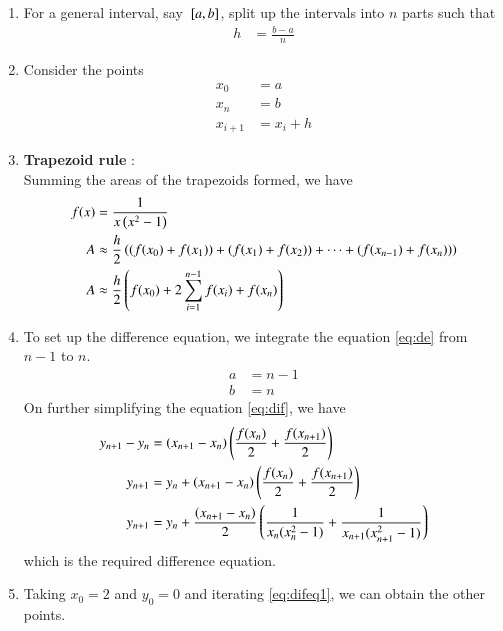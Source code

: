 \documentclass[journal]{IEEEtran}
\begin{document}
\begin{enumerate}
\item For a general interval, say ${}\left[a,b\right]$, split up the intervals into $n$ parts such that
\begin{align}
	h &= \frac{b-a}{n} \label{eq:split}
\end{align}
\item Consider the points 
\begin{align}
	x_{0} &= a \\
	x_{n} &= b \\
	x_{i+1} &= x_{i} + h
\end{align}
\item \textbf{Trapezoid rule} : \\
Summing the areas of the trapezoids formed, we have
\begin{align}
	f(x) &= \frac{1}{x \left(x^2 - 1\right)} \\
	A &\approx \frac{h}{2} \left((f(x_{0}) + f(x_{1})) + (f(x_{1}) + f(x_{2})) + \dots + (f(x_{n-1}) + f(x_{n}))\right) \\
	A &\approx \frac{h}{2} \left(f(x_{0}) + 2 \sum_{i=1}^{n-1} f(x_{i}) + f(x_{n}) \right) \label{eq:dif}
\end{align}
\item To set up the difference equation, we integrate the equation \eqref{eq:de} from $n-1$ to $n$.
	\begin{align}
		a &= n-1 \\
		b &= n
	\end{align}
		On further simplifying the equation \eqref{eq:dif}, we have
		\begin{align}
			y_{n+1} - y_{n} &= \left(x_{n+1} - x_{n}\right) \left(\frac{f(x_{n})}{2} + \frac{f(x_{n+1})}{2}\right) \\
			y_{n+1} &= y_{n} + \left(x_{n+1} - x_{n}\right) \left(\frac{f(x_{n})}{2} + \frac{f(x_{n+1})}{2}\right) \\
			y_{n+1} &= y_{n} + \frac{\left(x_{n+1} - x_{n}\right)}{2} \left(\frac{1}{x_{n}(x_{n}^2 - 1)} + \frac{1}{x_{n+1}(x_{n+1}^2 - 1)}\right) \label{eq:difeq1} 
		\end{align}
		which is the required difference equation.
	\item Taking $x_0 = 2$ and $y_0 = 0$ and iterating \eqref{eq:difeq1}, we can obtain the other points.\\


\end{enumerate}
\end{document}
